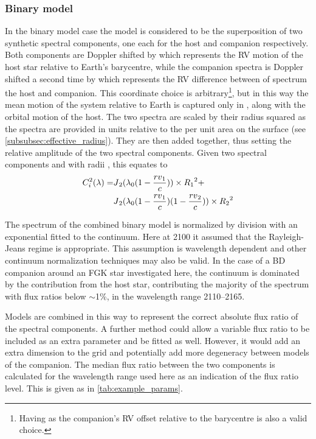 \subsubsection{Binary model}
\label{subsubsec:binary-model}
In the binary model case the model is considered to be the superposition of two synthetic spectral components, one each for the host and companion respectively.
Both components are Doppler shifted by \Rvone{} which represents the {RV} motion of the host star relative to Earth's barycentre, while the companion spectra is Doppler shifted a second time by \Rvtwo{} which represents the {RV} difference between of spectrum the host and companion.
This coordinate choice is arbitrary\footnote{Having \Rvtwo{} as the companion's {RV} offset relative to the barycentre is also a valid choice.}, but in this way the mean motion of the system relative to Earth is captured only in \Rvone{}, along with the orbital motion of the host.
The two spectra are scaled by their radius squared as the spectra are provided in units relative to the per unit area on the surface (see \cref{subsubsec:effective_radius}).
They are then added together, thus setting the relative amplitude of the two spectral components.
Given two spectral components \Jone{} and \Jtwo{} with radii \Rone{}, \Rtwo{} this equates to
\begin{align}
C^{2}_{i}(\lambda) = & {J{}}_{2}{}(\lambda_{0}(1 - \frac{{rv{}}_{1}{}}{c}))\times {{R}_{1}}^{2} +\nonumber \\
& {J{}}_{2}{}(\lambda_{0}(1 - \frac{{rv{}}_{1}{}}{c})(1 - \frac{{rv{}}_{2}{}}{c}))\times {{R}_{2}{}}^{2}
\end{align}

The spectrum of the combined binary model is normalized by division with an exponential fitted to the continuum.
Here at 2100\nm{} it assumed that the Rayleigh-Jeans regime is appropriate.
This assumption is wavelength dependent and other continuum normalization techniques may also be valid.
In the case of a {BD} companion around an {FGK} star investigated here, the continuum is dominated by the contribution from the host star, contributing the majority of the spectrum with flux ratios below \(\sim\)1\%, in the wavelength range 2110--2165\nm{}.

Models are combined in this way to represent the correct absolute flux ratio of the spectral components.
A further method could allow a variable flux ratio to be included as an extra parameter and be fitted as well.
However, it would add an extra dimension to the \textchisquared{} grid and potentially add more degeneracy between models of the companion.
The median flux ratio between the two components is calculated for the wavelength range used here as an indication of the flux ratio level.
This is given as \FtwoFone{} in \cref{tab:example_params}.


